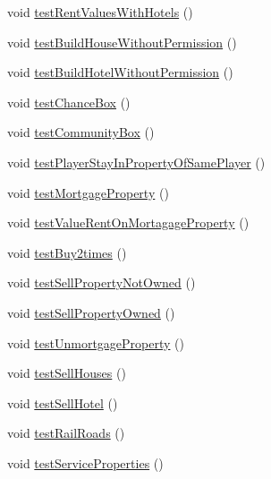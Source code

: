 \begin{DoxyCompactItemize}
\item 
void \hyperlink{class_monopoly_1_1_test_1_1_test_random_a60f8d558d761b7eeaf9ffdcef773f815}{test\+Rent\+Values\+With\+Hotels} ()
\item 
void \hyperlink{class_monopoly_1_1_test_1_1_test_random_a202f4241c54103b065ffba14e5c2892e}{test\+Build\+House\+Without\+Permission} ()
\item 
void \hyperlink{class_monopoly_1_1_test_1_1_test_random_a5e10ac2791cfd879c85956581f10ef5b}{test\+Build\+Hotel\+Without\+Permission} ()
\item 
void \hyperlink{class_monopoly_1_1_test_1_1_test_random_a836fd1b75a59d579d0b39dd79831ec19}{test\+Chance\+Box} ()
\item 
void \hyperlink{class_monopoly_1_1_test_1_1_test_random_a918cfbdcd54d3d59ee6c35109dcd583a}{test\+Community\+Box} ()
\item 
void \hyperlink{class_monopoly_1_1_test_1_1_test_random_ac49232b15f7a6e24b64cf28467b24122}{test\+Player\+Stay\+In\+Property\+Of\+Same\+Player} ()
\item 
void \hyperlink{class_monopoly_1_1_test_1_1_test_random_a9f9165bdf4e0054fee0d45cbb238e681}{test\+Mortgage\+Property} ()
\item 
void \hyperlink{class_monopoly_1_1_test_1_1_test_random_afd92aff015e173a6d8579a775930141a}{test\+Value\+Rent\+On\+Mortagage\+Property} ()
\item 
void \hyperlink{class_monopoly_1_1_test_1_1_test_random_ae7b422167e954ded94e0980ca27d6183}{test\+Buy2times} ()
\item 
void \hyperlink{class_monopoly_1_1_test_1_1_test_random_a763e48f4c405e6bc0fe1abd81f957d60}{test\+Sell\+Property\+Not\+Owned} ()
\item 
void \hyperlink{class_monopoly_1_1_test_1_1_test_random_a70cd3c6c0532720382ccc03fa23288f1}{test\+Sell\+Property\+Owned} ()
\item 
void \hyperlink{class_monopoly_1_1_test_1_1_test_random_a88deb2e09e2f7fc5411be3f92b849718}{test\+Unmortgage\+Property} ()
\item 
void \hyperlink{class_monopoly_1_1_test_1_1_test_random_a1d9a86608c9dae0f46258db205f7fbd2}{test\+Sell\+Houses} ()
\item 
void \hyperlink{class_monopoly_1_1_test_1_1_test_random_a126aa784520ce82b176dd35848fc39af}{test\+Sell\+Hotel} ()
\item 
void \hyperlink{class_monopoly_1_1_test_1_1_test_random_a6c98865897154a783d54e0778475f3b5}{test\+Rail\+Roads} ()
\item 
void \hyperlink{class_monopoly_1_1_test_1_1_test_random_af042de5776822c441116991ddea7c24c}{test\+Service\+Properties} ()
\end{DoxyCompactItemize}
